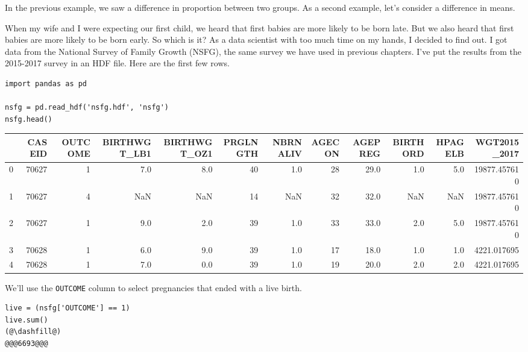 In the previous example, we saw a difference in proportion between two
groups. As a second example, let's consider a difference in means.

When my wife and I were expecting our first child, we heard that first
babies are more likely to be born late. But we also heard that first
babies are more likely to be born early. So which is it? As a data
scientist with too much time on my hands, I decided to find out. I got
data from the National Survey of Family Growth (NSFG), the same survey
we have used in previous chapters. I've put the results from the
2015-2017 survey in an HDF file. Here are the first few rows.

\begin{lstlisting}[]
import pandas as pd

nsfg = pd.read_hdf('nsfg.hdf', 'nsfg')
nsfg.head()
\end{lstlisting}

\begin{tabular}{lrrrrrrrrrrr}
\midrule
{} &  CASEID &  OUTCOME &  BIRTHWGT\_LB1 &  BIRTHWGT\_OZ1 &  PRGLNGTH &  NBRNALIV &  AGECON &  AGEPREG &  BIRTHORD &  HPAGELB &  WGT2015\_2017 \\
\midrule
0 &   70627 &        1 &           7.0 &           8.0 &        40 &       1.0 &      28 &     29.0 &       1.0 &      5.0 &  19877.457610 \\
1 &   70627 &        4 &           NaN &           NaN &        14 &       NaN &      32 &     32.0 &       NaN &      NaN &  19877.457610 \\
2 &   70627 &        1 &           9.0 &           2.0 &        39 &       1.0 &      33 &     33.0 &       2.0 &      5.0 &  19877.457610 \\
3 &   70628 &        1 &           6.0 &           9.0 &        39 &       1.0 &      17 &     18.0 &       1.0 &      1.0 &   4221.017695 \\
4 &   70628 &        1 &           7.0 &           0.0 &        39 &       1.0 &      19 &     20.0 &       2.0 &      2.0 &   4221.017695 \\
\midrule
\end{tabular}

We'll use the \passthrough{\lstinline!OUTCOME!} column to select
pregnancies that ended with a live birth.

\begin{lstlisting}[]
live = (nsfg['OUTCOME'] == 1)
live.sum()
(@\dashfill@)
@@@6693@@@
\end{lstlisting}

